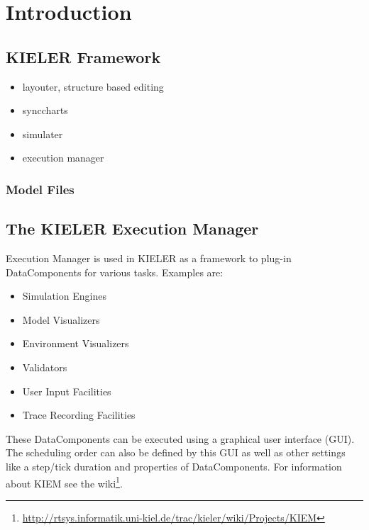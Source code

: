 

\chapter{Introduction}
\label{chapter:introduction}
\section{KIELER Framework}
\label{sec:intro/Kieler}
\begin{itemize}
 \item layouter, structure based editing
 \item synccharts
 \item simulater
 \item execution manager
\end{itemize}

\subsection{Model Files}
\label{section:IntroModelFile}

\section{The KIELER Execution Manager}
\label{sec:intro/Kiem}
Execution Manager is used in KIELER as a framework to plug-in DataComponents for various tasks. Examples are:
\begin{itemize}
 \item Simulation Engines
 \item Model Visualizers
 \item Environment Visualizers
 \item Validators
 \item User Input Facilities
 \item Trace Recording Facilities 
\end{itemize}

These DataComponents can be executed using a graphical user interface (GUI). 
The scheduling order can also be defined by this GUI as well as other settings like a step/tick duration and properties of DataComponents.
For information about \ac{KIEM} see the wiki\footnote{\url{http://rtsys.informatik.uni-kiel.de/trac/kieler/wiki/Projects/KIEM}}.

